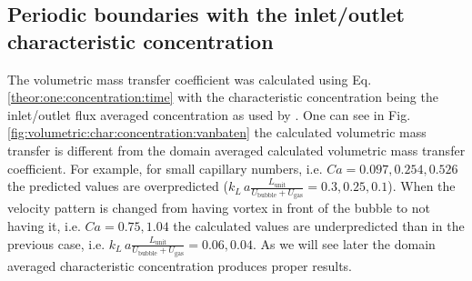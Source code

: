 \documentclass{article}
\newcommand{\vol}{k_L\,a}
\newcommand{\lunit}{L_{\mathrm{unit}}}
\newcommand{\ububble}{U_{\mathrm{bubble}}}
\newcommand{\ugas}{U_{\mathrm{gas}}}
\newcommand{\volnondim}{\vol \frac{\lunit}{\ububble+\ugas}}
\begin{document}
\subsection{Periodic boundaries with the inlet/outlet characteristic concentration}
\label{results:periodic:inlet:outlet}
The volumetric mass transfer coefficient was calculated using Eq. \ref{theor:one:concentration:time} with the characteristic concentration being the inlet/outlet flux averaged concentration as used by \citet{vanbaten-circular}. One can
see in Fig. \ref{fig:volumetric:char:concentration:vanbaten} the calculated volumetric mass transfer is different from the domain averaged calculated volumetric mass transfer coefficient. For example,
for small capillary numbers, i.e. $Ca=0.097,0.254,0.526$ the predicted values are overpredicted
($\volnondim=0.3,0.25,0.1$). When the velocity pattern is changed from having vortex in front of
the bubble to not having it,  i.e. $Ca=0.75,1.04$ the calculated values
are underpredicted than in the previous case, i.e. $\volnondim=0.06,0.04$. As we will see later the domain averaged characteristic concentration produces proper results. 
\end{document}
